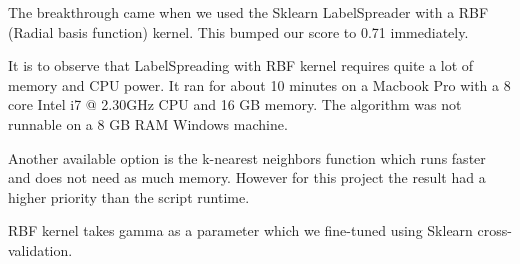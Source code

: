 \documentclass[a4paper, 11pt]{article}
\begin{document}
The breakthrough came when we used the Sklearn LabelSpreader with a RBF (Radial basis function) kernel. This bumped our score to 0.71 immediately.

It is to observe that LabelSpreading with RBF kernel requires quite a lot of memory and CPU power. It ran for about 10 minutes on a Macbook Pro with a 8 core Intel i7 @ 2.30GHz CPU and 16 GB memory. The algorithm was not runnable on a 8 GB RAM Windows machine.

Another available option is the k-nearest neighbors function which runs faster and does not need as much memory. However for this project the result had a higher priority than the script runtime.

RBF kernel takes gamma as a parameter which we fine-tuned using Sklearn cross-validation.
\end{document}
